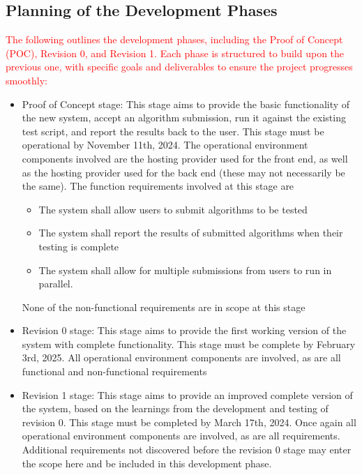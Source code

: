 \documentclass[12pt]{article}
\begin{document}
\subsection{Planning of the Development Phases}
\textcolor{red}{The following outlines the development phases, including the Proof of Concept (POC), Revision 0, and Revision 1. Each phase is structured to build upon the previous one, with specific goals and deliverables to ensure the project progresses smoothly:}
\begin{itemize}
\item Proof of Concept stage:
This stage aims to provide the basic functionality of the new system, accept an algorithm submission, run it against the existing test script, and report the results back to the user. This stage must be operational by November 11th, 2024. The operational environment components involved are the hosting provider used for the front end, as well as the hosting provider used for the back end (these may not necessarily be the same). The function requirements involved at this stage are
\begin{itemize}
    \item The system shall allow users to submit algorithms to be tested 
\item The system shall report the results of submitted algorithms when their testing is complete
\item The system shall allow for multiple submissions from users to run in parallel. 
\end{itemize}

None of the non-functional requirements are in scope at this stage

\item Revision 0 stage:
This stage aims to provide the first working version of the system with complete functionality. This stage must be complete by February 3rd, 2025. All operational environment components are involved, as are all functional and non-functional requirements
	
\item Revision 1 stage:
This stage aims to provide an improved complete version of the system, based on the learnings from the development and testing of revision 0. This stage must be completed by March 17th, 2024. Once again all operational environment components are involved, as are all requirements. Additional requirements not discovered before the revision 0 stage may enter the scope here and be included in this development phase.  
\end{itemize}
\end{document}
